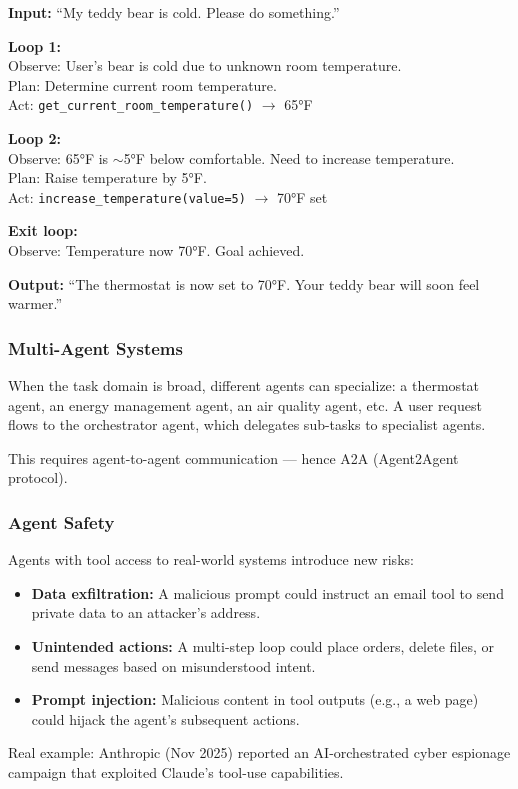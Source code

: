 \documentclass[11pt, a4paper]{article}
\begin{document}
\begin{exbox}
\textbf{Input:} ``My teddy bear is cold. Please do something.''

\textbf{Loop 1:}\\
Observe: User's bear is cold due to unknown room temperature.\\
Plan: Determine current room temperature.\\
Act: \texttt{get\_current\_room\_temperature()} $\to$ 65°F

\textbf{Loop 2:}\\
Observe: 65°F is $\sim$5°F below comfortable. Need to increase temperature.\\
Plan: Raise temperature by 5°F.\\
Act: \texttt{increase\_temperature(value=5)} $\to$ 70°F set

\textbf{Exit loop:}\\
Observe: Temperature now 70°F. Goal achieved.

\textbf{Output:} ``The thermostat is now set to 70°F. Your teddy bear will soon feel warmer.''
\end{exbox}

\subsubsection{Multi-Agent Systems}

When the task domain is broad, different agents can specialize: a thermostat agent, an energy management agent, an air quality agent, etc. A user request flows to the orchestrator agent, which delegates sub-tasks to specialist agents.

This requires agent-to-agent communication --- hence A2A (Agent2Agent protocol).

\subsubsection{Agent Safety}

\begin{warnbox}
Agents with tool access to real-world systems introduce new risks:
\begin{itemize}[leftmargin=1.5em]
  \item \textbf{Data exfiltration:} A malicious prompt could instruct an email tool to send private data to an attacker's address.
  \item \textbf{Unintended actions:} A multi-step loop could place orders, delete files, or send messages based on misunderstood intent.
  \item \textbf{Prompt injection:} Malicious content in tool outputs (e.g., a web page) could hijack the agent's subsequent actions.
\end{itemize}
Real example: Anthropic (Nov 2025) reported an AI-orchestrated cyber espionage campaign that exploited Claude's tool-use capabilities.
\end{warnbox}
\end{document}
